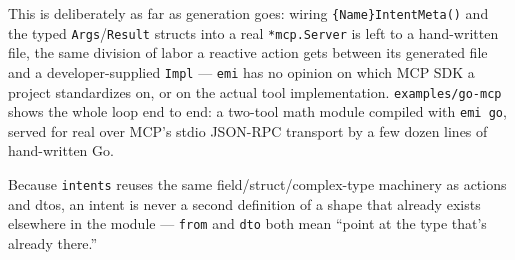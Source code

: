 This is deliberately as far as generation goes: wiring
\texttt{\{Name\}IntentMeta()} and the typed \texttt{Args}/\texttt{Result}
structs into a real \texttt{*mcp.Server} is left to a hand-written file,
the same division of labor a reactive action gets between its
generated file and a developer-supplied \texttt{Impl} --- \texttt{emi}
has no opinion on which MCP SDK a project standardizes on, or on the
actual tool implementation. \texttt{examples/go-mcp} shows the whole
loop end to end: a two-tool math module compiled with \texttt{emi go},
served for real over MCP's stdio JSON-RPC transport by a few dozen
lines of hand-written Go.

\begin{pullquote}
Because \texttt{intents} reuses the same field/struct/complex-type
machinery as actions and dtos, an intent is never a second definition
of a shape that already exists elsewhere in the module --- \texttt{from}
and \texttt{dto} both mean ``point at the type that's already there.''
\end{pullquote}
